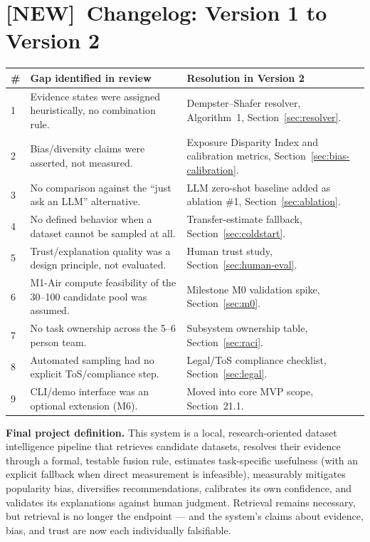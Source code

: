 \documentclass[11pt]{article}
\newcommand{\newtag}{\textcolor{accent}{\textbf{[NEW]}}\ }
\begin{document}
\section{\newtag Changelog: Version 1 to Version 2}
\begin{table}[h]
\centering
\small
\begin{tabular}{@{}p{1.1cm}p{5.6cm}p{5.6cm}@{}}
\toprule
\textbf{\#} & \textbf{Gap identified in review} & \textbf{Resolution in Version 2} \\
\midrule
1 & Evidence states were assigned heuristically, no combination rule. &
    Dempster--Shafer resolver, Algorithm~1, Section~\ref{sec:resolver}. \\
2 & Bias/diversity claims were asserted, not measured. &
    Exposure Disparity Index and calibration metrics, Section~\ref{sec:bias-calibration}. \\
3 & No comparison against the ``just ask an LLM'' alternative. &
    LLM zero-shot baseline added as ablation \#1, Section~\ref{sec:ablation}. \\
4 & No defined behavior when a dataset cannot be sampled at all. &
    Transfer-estimate fallback, Section~\ref{sec:coldstart}. \\
5 & Trust/explanation quality was a design principle, not evaluated. &
    Human trust study, Section~\ref{sec:human-eval}. \\
6 & M1-Air compute feasibility of the 30--100 candidate pool was assumed. &
    Milestone M0 validation spike, Section~\ref{sec:m0}. \\
7 & No task ownership across the 5--6 person team. &
    Subsystem ownership table, Section~\ref{sec:raci}. \\
8 & Automated sampling had no explicit ToS/compliance step. &
    Legal/ToS compliance checklist, Section~\ref{sec:legal}. \\
9 & CLI/demo interface was an optional extension (M6). &
    Moved into core MVP scope, Section~21.1. \\
\bottomrule
\end{tabular}
\end{table}

\textbf{Final project definition.} This system is a local, research-oriented dataset intelligence
pipeline that retrieves candidate datasets, resolves their evidence through a formal, testable fusion
rule, estimates task-specific usefulness (with an explicit fallback when direct measurement is
infeasible), measurably mitigates popularity bias, diversifies recommendations, calibrates its own
confidence, and validates its explanations against human judgment. Retrieval remains necessary, but
retrieval is no longer the endpoint --- and the system's claims about evidence, bias, and trust are now
each individually falsifiable.
\end{document}
